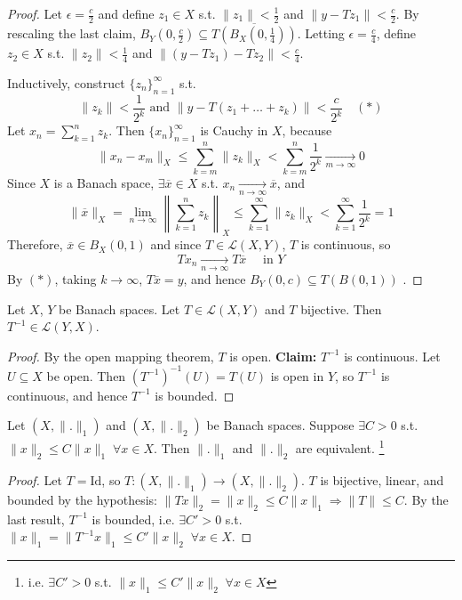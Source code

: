 \begin{proof}
        Let $\epsilon = \frac{c}{2}$ and define $z_1 \in X$ s.t. $\| z_1 \| < \frac{1}{2}$ and $\| y - Tz_1 \| < 
        \frac{c}{2}$. 
        By rescaling the last claim, $B_Y(0, \frac{c}{2}) \subseteq \overline{T(B_X(0, \frac{1}{4}))}$.
        Letting $\epsilon = \frac{c}{4}$, define $z_2 \in X$ s.t. $\| z_2 \| < \frac{1}{4}$ and
        $\| (y - Tz_1) - Tz_2 \| < \frac{c}{4}$.

        Inductively, construct $\{ z_n \}_{n=1}^{\infty} $ s.t. 
        \[
        \| z_k \| < \frac{1}{2^k} \text{ and } \| y - T(z_1 + \dots + z_k) \| < \frac{c}{2^k} \quad (*)
        \]
        Let $x_n = \sum_{k=1}^{n} z_k$. Then $\{x_{n}\}_{n=1}^{\infty} $ is Cauchy in $X$, 
        because 
        \[
            \| x_n - x_m \|_X \leq \sum_{k=m}^{n} \| z_k \|_X < \sum_{k = m}^n \frac{1}{2^k} 
            \xrightarrow[m \to \infty]{} 0
        \]     
    Since $X$ is a Banach space, $\exists \overline{x} \in X$ s.t. 
    $x_n \xrightarrow[n \to \infty]{} \overline{x}$, and 
    \[
    \| \overline{x} \|_X = \lim_{n \to \infty} \left\| \sum_{k=1}^n z_k \right\|_X \leq \sum_{k=1}^{\infty} 
    \| z_k \|_X < \sum_{k=1}^{\infty} \frac{1}{2^k} = 1
    \]
    Therefore, $\overline{x} \in B_X(0, 1)$ and since $T \in \mathcal{L}(X, Y)$, $T$ is continuous,
    so
    \[
        T x_n \xrightarrow[n \to \infty]{} T \overline{x} \quad \text{ in } Y
    \]   
    By $(*)$, taking $k \to \infty$, $T \overline{x} = y$, and hence $B_Y(0, c) \subseteq T(B(0, 1))$ .
\end{proof}


\begin{cor}
    Let $X$, $Y$ be Banach spaces. Let $T \in \mathcal{L}(X, Y)$ and $T$ bijective. Then 
    $T^{-1} \in \mathcal{L}(Y, X)$.     
\end{cor} 
\begin{proof}
    By the open mapping theorem, $T$ is open.
    \newline \noindent \textbf{Claim:} $T^{-1}$ is continuous.
    \newline \noindent Let $U \subseteq X$ be open. Then $(T^{-1})^{-1}(U) = T(U)$ is open in $Y$,
    so $T^{-1}$ is continuous, and hence $T^{-1}$ is bounded. \qedhere       
\end{proof}

\begin{cor}
    Let $(X, \| . \|_1 )$ and $(X, \| . \|_2 )$ be Banach spaces. Suppose $ \exists C > 0$ s.t.
    $\| x \|_2 \leq C \| x \|_1  \; \forall x \in X$. Then $\| . \|_1 $ and $\| . \|_2 $ are equivalent.
    \footnote{i.e. $\exists C' > 0$ s.t. $\| x \|_1 \leq C' \| x \|_2 \; \forall x \in X$ }   
\end{cor}
\begin{proof}
    Let $T = \text{Id}$, so $T : (X, \| . \|_1 ) \to (X, \| . \|_2 )$. $T$ is bijective, linear,
    and bounded by the hypothesis: $\| T x \|_2 = \| x \|_2 \leq C \| x \|_1 \Rightarrow \| T \| \leq C $.
    By the last result, $T^{-1}$ is bounded, i.e. $\exists C' > 0$ s.t. $\| x \|_1 = \| T^{-1}x \|_1
    \leq C' \| x \|_2 \; \forall x \in X$. \qedhere       
\end{proof}

